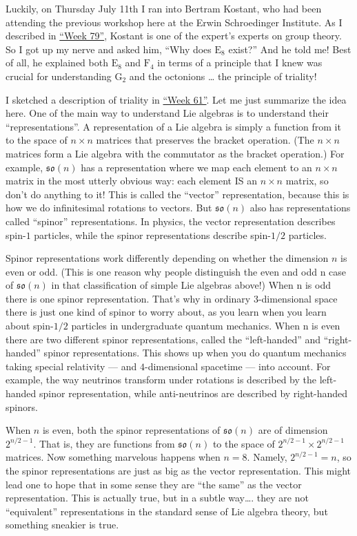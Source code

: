 \documentclass{article}
\begin{document}
Luckily, on Thursday July 11th I ran into Bertram Kostant, who had been
attending the previous workshop here at the Erwin Schroedinger
Institute. As I described in \protect\hyperlink{week79}{``Week 79''},
Kostant is one of the expert's experts on group theory. So I got up my
nerve and asked him, ``Why does \(\mathrm{E}_8\) exist?'' And he told
me! Best of all, he explained both \(\mathrm{E}_8\) and \(\mathrm{F}_4\)
in terms of a principle that I knew was crucial for understanding
\(\mathrm{G}_2\) and the octonions \ldots{} the principle of triality!

I sketched a description of triality in
\protect\hyperlink{week61}{``Week 61''}. Let me just summarize the idea
here. One of the main way to understand Lie algebras is to understand
their ``representations''. A representation of a Lie algebra is simply a
function from it to the space of \(n\times n\) matrices that preserves
the bracket operation. (The \(n\times n\) matrices form a Lie algebra
with the commutator as the bracket operation.) For example,
\(\mathfrak{so}(n)\) has a representation where we map each element to
an \(n\times n\) matrix in the most utterly obvious way: each element IS
an \(n\times n\) matrix, so don't do anything to it! This is called the
``vector'' representation, because this is how we do infinitesimal
rotations to vectors. But \(\mathfrak{so}(n)\) also has representations
called ``spinor'' representations. In physics, the vector representation
describes spin-\(1\) particles, while the spinor representations
describe spin-\(1/2\) particles.

Spinor representations work differently depending on whether the
dimension \(n\) is even or odd. (This is one reason why people
distinguish the even and odd n case of \(\mathfrak{so}(n)\) in that
classification of simple Lie algebras above!) When n is odd there is one
spinor representation. That's why in ordinary \(3\)-dimensional space
there is just one kind of spinor to worry about, as you learn when you
learn about spin-\(1/2\) particles in undergraduate quantum mechanics.
When n is even there are two different spinor representations, called
the ``left-handed'' and ``right-handed'' spinor representations. This
shows up when you do quantum mechanics taking special relativity --- and
\(4\)-dimensional spacetime --- into account. For example, the way
neutrinos transform under rotations is described by the left-handed
spinor representation, while anti-neutrinos are described by
right-handed spinors.

When \(n\) is even, both the spinor representations of
\(\mathfrak{so}(n)\) are of dimension \(2^{n/2 - 1}\). That is, they are
functions from \(\mathfrak{so}(n)\) to the space of
\(2^{n/2 - 1} \times 2^{n/2 - 1}\) matrices. Now something marvelous
happens when \(n = 8\). Namely, \(2^{n/2 - 1} = n\), so the spinor
representations are just as big as the vector representation. This might
lead one to hope that in some sense they are ``the same'' as the vector
representation. This is actually true, but in a subtle way\ldots. they
are not ``equivalent'' representations in the standard sense of Lie
algebra theory, but something sneakier is true.
\end{document}
